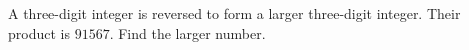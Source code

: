 A three-digit integer is reversed to form a larger three-digit integer. Their product is $91567$. Find the larger number.

